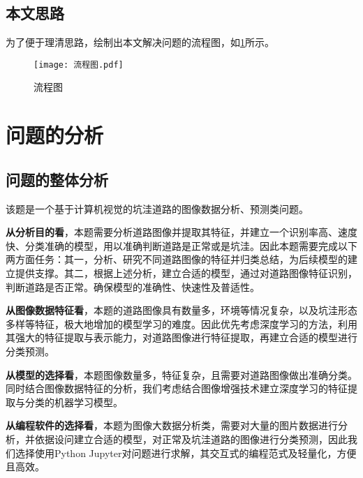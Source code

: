 \documentclass{MathorCupmodeling}
\begin{document}
	\subsection{本文思路}
	为了便于理清思路，绘制出本文解决问题的流程图，如\textcolor{blue}{\cref{fig:流程图}}所示。
	\begin{figure}[H]
		\centering
		\texttt{[image: 流程图.pdf]}
		\caption{流程图}
		\label{fig:流程图}
	\end{figure}
	\section{问题的分析}
	\subsection{问题的整体分析}
	该题是一个基于计算机视觉的坑洼道路的图像数据分析、预测类问题。

	\textbf{从分析目的看}，本题需要分析道路图像并提取其特征，并建立一个识别率高、速度快、分类准确的模型，用以准确判断道路是正常或是坑洼。因此本题需要完成以下两方面任务：{\heiti 其一}，分析、研究不同道路图像的特征并归类总结，为后续模型的建立提供支撑。{\heiti 其二}，根据上述分析，建立合适的模型，通过对道路图像特征识别，判断道路是否正常。确保模型的准确性、快速性及普适性。

	\textbf{从图像数据特征看}，本题的道路图像具有数量多，环境等情况复杂，以及坑洼形态多样等特征，极大地增加的模型学习的难度。因此优先考虑深度学习的方法，利用其强大的特征提取与表示能力，对道路图像进行特征提取，再建立合适的模型进行分类预测。

	\textbf{从模型的选择看}，本题图像数量多，特征复杂，且需要对道路图像做出准确分类。同时结合图像数据特征的分析，我们考虑结合图像增强技术建立深度学习的特征提取与分类的机器学习模型。

	\textbf{从编程软件的选择看}，本题为图像大数据分析类，需要对大量的图片数据进行分析，并依据设问建立合适的模型，对正常及坑洼道路的图像进行分类预测，因此我们选择使用Python Jupyter对问题进行求解，其交互式的编程范式及轻量化，方便且高效。
\end{document}
